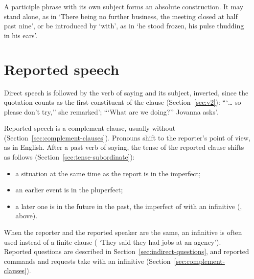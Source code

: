 A participle phrase with its own subject forms an absolute construction. It may stand alone, as in  `There being no further business, the meeting closed at half past nine', or be introduced by  `with', as in  `he stood frozen, his pulse thudding in his ears'.

\section{Reported speech}\label{sec:reported-speech}
Direct speech is followed by the verb of saying and its subject, inverted, since the quotation counts as the first constituent of the clause (Section~\ref{sec:v2}):  ```\ldots{} so please don't try,'' she remarked';  ```What are we doing?'' Jovanna asks'.

Reported speech is a complement clause, usually without  (Section~\ref{sec:complement-clauses}). Pronouns shift to the reporter's point of view, as in English. After a past verb of saying, the tense of the reported clause shifts as follows (Section~\ref{sec:tense-subordinate}):
\begin{itemize}
    \item a situation at the same time as the report is in the imperfect;
    \item an earlier event is in the pluperfect;
    \item a later one is in the future in the past, the imperfect of  with an infinitive (, above).
\end{itemize}
When the reporter and the reported speaker are the same, an infinitive is often used instead of a finite clause ( `They said they had jobs at an agency'). Reported questions are described in Section~\ref{sec:indirect-questions}, and reported commands and requests take  with an infinitive (Section~\ref{sec:complement-clauses}).
